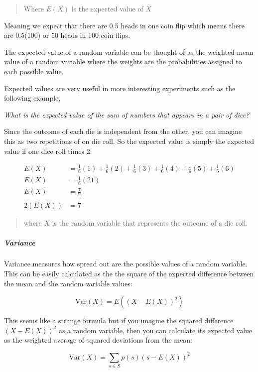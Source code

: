 \begin{quote}
Where \textbf{\(E(X)\)} is the expected value of \textbf{\(X\)}
\end{quote}

Meaning we expect that there are 0.5 heads in one coin flip which means
there are 0.5(100) or 50 heads in 100 coin flips.

The expected value of a random variable can be thought of as the
weighted mean value of a random variable where the weights are the
probabilities assigned to each possible value.

Expected values are very useful in more interesting experiments such as
the following example,

\emph{What is the expected value of the sum of numbers that appears in a
pair of dice?}

Since the outcome of each die is independent from the other, you can
imagine this as two repetitions of on die roll. So the expected value is
simply the expected value if one dice roll times 2:

\[
\begin{aligned}
E(X)&=\frac{1}{6}(1)+\frac{1}{6}(2)+\frac{1}{6}(3)+\frac{1}{6}(4)+\frac{1}{6}(5)+\frac{1}{6}(6)\\
E(X)&=\frac{1}{6}(21)\\
E(X)&=\frac{7}{2}\\\\
2(E(X))&=7
\end{aligned}
\]

\begin{quote}
where \textbf{\(X\)} is the random variable that represents the outcome
of a die roll.
\end{quote}

\hypertarget{variance}{%
\subparagraph{Variance}\label{variance}}

Variance measures how spread out are the possible values of a random
variable. This can be easily calculated as the the square of the
expected difference between the mean and the random variable values:

\[
\text{Var}(X)=E((X-E(X))^2)
\]

This seems like a strange formula but if you imagine the squared
difference \textbf{\((X-E(X))^2\)} as a random variable, then you can
calculate its expected value as the weighted average of squared
deviations from the mean:

\[
\text{Var}(X)=\sum_{s \in S}p(s)(s-E(X))^2
\]
